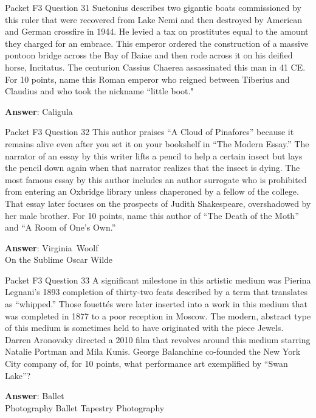 \begin{frame}{Packet F3 Question 31}
Suetonius describes two gigantic boats commissioned by this ruler that were recovered from Lake Nemi and then destroyed by American and German crossfire in 1944. He levied a tax on prostitutes equal to the amount they charged for an embrace. This emperor ordered the construction of a massive pontoon bridge   across the Bay of Baiae and then rode     across it on his deified horse, Incitatus. The centurion Cassius Chaerea assassinated this man in   41 CE. For 10 points, name this Roman emperor who reigned between Tiberius and Claudius and who took the nickname “little boot."

\textbf{Answer}: Caligula\\
\end{frame}

\begin{frame}{Packet F3 Question 32}
This author praises ``A   Cloud of Pinafores'' because it remains alive even after you set it on your bookshelf in ``The Modern Essay.'' The narrator   of an essay by this   writer lifts a pencil to help a certain   insect but lays the pencil down again when that narrator realizes that the insect is dying. The most famous essay by this author includes an author surrogate who is prohibited from entering an Oxbridge library unless chaperoned by a fellow of the college. That essay later focuses on the prospects of Judith Shakespeare, overshadowed by her   male brother. For 10 points, name this author of ``The Death of the Moth'' and ``A Room of One's Own.''

\textbf{Answer}: Virginia\ Woolf\\
 On the Sublime
 Oscar Wilde
\end{frame}

\begin{frame}{Packet F3 Question 33}
A significant milestone in this artistic medium was Pierina Legnani's 1893 completion of thirty-two feats described by a term that translates as ``whipped.'' Those fouettés were later inserted into a work in this medium that was completed in 1877 to a poor reception in Moscow. The modern, abstract type of this medium is sometimes   held to have originated with the piece Jewels. Darren Aronovsky directed a 2010 film that revolves around this medium starring Natalie Portman and Mila Kunis. George Balanchine co-founded the New York City company of, for 10 points, what performance art exemplified by ``Swan Lake''?      

\textbf{Answer}: Ballet\\
 Photography
 Ballet
 Tapestry
 Photography
\end{frame}


